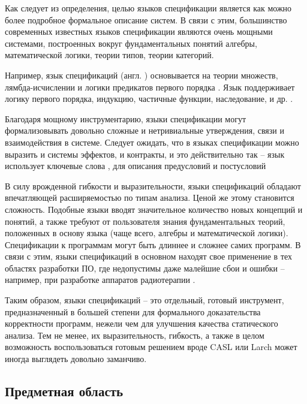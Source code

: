 Как следует из определения, целью языков спецификации является как можно более подробное формальное описание систем. В связи с этим, большинство современных известных языков спецификации являются очень мощными системами, построенных вокруг фундаментальных понятий алгебры, математической логики, теории типов, теории категорий.

Например, язык спецификаций  (англ. ) основывается на теории множеств, лямбда-исчислении и логики предикатов первого порядка \cite{Z-notation}. Язык  поддерживает логику первого порядка, индукцию, частичные функции, наследование, и др. \cite{CASL}.

Благодаря мощному инструментарию, языки спецификации могут формализовывать довольно сложные и нетривиальные утверждения, связи и взаимодействия в системе. Следует ожидать, что в языках спецификации можно выразить и системы эффектов, и контракты, и это действительно так -- язык  использует ключевые слова ,  для описания предусловий и постусловий \cite{Larch}

В силу врожденной гибкости и выразительности, языки спецификаций обладают впечатляющей расширяемостью по типам анализа. Ценой же этому становится сложность. Подобные языки вводят значительное количество новых концепций и понятий, а также требуют от пользователя знания фундаментальных теорий, положенных в основу языка (чаще всего, алгебры и математической логики). Спецификации к программам могут быть длиннее и сложнее самих программ. В связи с этим, языки спецификаций в основном находят свое применение в тех областях разработки ПО, где недопустимы даже малейшие сбои и ошибки -- например, при разработке аппаратов радиотерапии \cite{Jacky97}.

Таким образом, языки спецификаций -- это отдельный, готовый инструмент, предназначенный в большей степени для формального доказательства корректности программ, нежели чем для улучшения качества статического анализа. Тем не менее, их выразительность, гибкость, а также в целом возможность воспользоваться готовым решением вроде CASL или Larch может иногда выглядеть довольно заманчиво. 



\newpage



\subsection{Предметная область}

